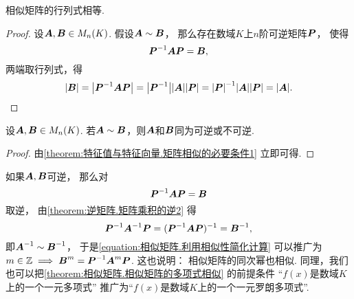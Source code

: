 \begin{property}\label{theorem:特征值与特征向量.矩阵相似的必要条件1}
相似矩阵的行列式相等.
\begin{proof}
设\(\boldsymbol{A},\boldsymbol{B} \in M_n(K)\).
假设\(\boldsymbol{A}\sim\boldsymbol{B}\)，
那么存在数域\(K\)上\(n\)阶可逆矩阵\(\boldsymbol{P}\)，
使得\begin{equation*}
	\boldsymbol{P}^{-1}\boldsymbol{A}\boldsymbol{P}=\boldsymbol{B},
\end{equation*}
两端取行列式，得\begin{equation*}
	\abs{\boldsymbol{B}} = \abs{\boldsymbol{P}^{-1}\boldsymbol{A}\boldsymbol{P}}
	= \abs{\boldsymbol{P}^{-1}}\abs{\boldsymbol{A}}\abs{\boldsymbol{P}}
	= \abs{\boldsymbol{P}}^{-1}\abs{\boldsymbol{A}}\abs{\boldsymbol{P}}
	= \abs{\boldsymbol{A}}.
	\qedhere
\end{equation*}
\end{proof}
\end{property}
\begin{proposition}
设\(\boldsymbol{A},\boldsymbol{B} \in M_n(K)\).
若\(\boldsymbol{A}\sim\boldsymbol{B}\)，则\(\boldsymbol{A}\)和\(\boldsymbol{B}\)同为可逆或不可逆.
\begin{proof}
由\cref{theorem:特征值与特征向量.矩阵相似的必要条件1} 立即可得.
\end{proof}
\end{proposition}
\begin{remark}
如果\(\boldsymbol{A},\boldsymbol{B}\)可逆，
那么对\begin{equation*}
	\boldsymbol{P}^{-1} \boldsymbol{A} \boldsymbol{P} = \boldsymbol{B}
\end{equation*}取逆，
由\cref{theorem:逆矩阵.矩阵乘积的逆2} 得\begin{equation*}
	\boldsymbol{P}^{-1} \boldsymbol{A}^{-1} \boldsymbol{P}
	= (\boldsymbol{P}^{-1} \boldsymbol{A} \boldsymbol{P})^{-1}
	= \boldsymbol{B}^{-1},
\end{equation*}
即\(\boldsymbol{A}^{-1} \sim \boldsymbol{B}^{-1}\)，
于是\cref{equation:相似矩阵.利用相似性简化计算}
可以推广为\(m\in\mathbb{Z} \implies \boldsymbol{B}^m = \boldsymbol{P}^{-1}\boldsymbol{A}^m\boldsymbol{P}\).
这也说明：
相似矩阵的同次幂也相似.
同理，我们也可以把\cref{theorem:相似矩阵.相似矩阵的多项式相似} 的前提条件
“\(f(x)\)是数域\(K\)上的一个一元多项式”
推广为“\(f(x)\)是数域\(K\)上的一个一元罗朗多项式”.
\end{remark}

